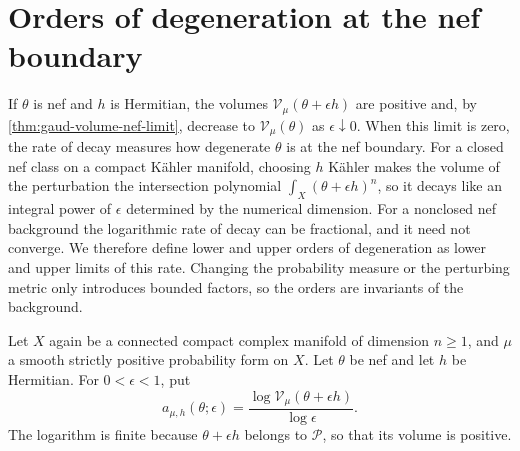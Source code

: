 \section{Orders of degeneration at the nef boundary}
\label{sec:nef-volume-degeneration}

If $\theta$ is nef and $h$ is Hermitian, the volumes $\mathcal V_\mu(\theta+\epsilon h)$ are positive and, by \cref{thm:gaud-volume-nef-limit}, decrease to $\mathcal V_\mu(\theta)$ as $\epsilon\downarrow0$. When this limit is zero, the rate of decay measures how degenerate $\theta$ is at the nef boundary. For a closed nef class on a compact K\"ahler manifold, choosing $h$ K\"ahler makes the volume of the perturbation the intersection polynomial $\int_X(\theta+\epsilon h)^n$, so it decays like an integral power of $\epsilon$ determined by the numerical dimension. For a nonclosed nef background the logarithmic rate of decay can be fractional, and it need not converge. We therefore define lower and upper orders of degeneration as lower and upper limits of this rate. Changing the probability measure or the perturbing metric only introduces bounded factors, so the orders are invariants of the background.

Let $X$ again be a connected compact complex manifold of dimension $n\geq1$, and $\mu$ a smooth strictly positive probability form on $X$. Let $\theta$ be nef and let $h$ be Hermitian. For $0<\epsilon<1$, put
\[
 a_{\mu,h}(\theta;\epsilon)
   =\frac{\log\mathcal V_\mu(\theta+\epsilon h)}{\log\epsilon}.
\]
The logarithm is finite because $\theta+\epsilon h$ belongs to $\mathscr P$, so that its volume is positive.

